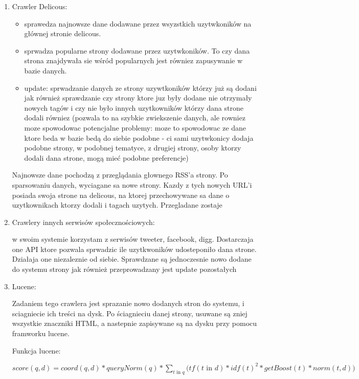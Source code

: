 \begin{enumerate}
\item Crawler Delicous:

\begin{itemize}
\item sprawedza najnowsze dane dodawane przez wsyzstkich uzytwkoników na głównej stronie delicous.
\item sprwadza popularne strony dodawane przez uzytwkoników. To czy dana strona znajdywała sie wśród popularnych jest równiez zapusywanie w bazie danych.
\item update: sprwadzanie danych ze strony uzywtkoników którzy już są dodani jak również sprawdzanie czy strony ktore juz były dodane nie otrzymały nowych tagów i czy nie było innych uzytkowników którzy dana strone dodali równiez (pozwala to na szybkie zwiekszenie danych, ale rowniez moze spowodowac potencjalne problemy: moze to spowodowac ze dane ktore beda w bazie bedą do siebie podobne - ci sami uzytwkonicy dodaja podobne strony, w podobnej tematyce, z drugiej strony,  osoby ktorzy dodali dana strone, mogą mieć podobne preferencje)
\end{itemize}

Najnowsze dane pochodzą z przeglądania głownego RSS’a strony. Po sparsowaniu danych, wyciagane sa nowe strony. Kazdy z tych nowych URL’i posiada swoja strone na delicous, na ktorej przechowywane sa dane o uzytkownikach ktorzy dodali i tagach uzytych. Przegladane zostaje



\item Crawlery innych serwisów społecznościowych:

w swoim systemie korzystam z serwisów tweeter, facebook, digg. Dostarczaja one API ktore pozwala sprwadzic ile uzytkwoników udosteponiło dana strone. Działaja one niezaleznie od siebie. Sprawdzane są jednoczesnie nowo dodane do systemu strony jak również przeprowadzany jest update pozostałych

\item Lucene:

Zadaniem tego crawlera jest sprazanie nowo dodanych stron do systemu, i sciagniecie ich treści na dysk. Po ściagnieciu danej strony, usuwane są zniej wszystkie znaczniki HTML, a nastepnie zapisywane są na dysku przy pomocu framworku lucene.

Funkcja lucene:


$score(q,d) =   coord(q,d)  *  queryNorm(q) * \sum_{t \text{ in } q}  \bigg( tf(t\text{ in } d)  *  idf(t)^2  *  getBoost(t) *  norm(t,d) )$



\end{enumerate}
